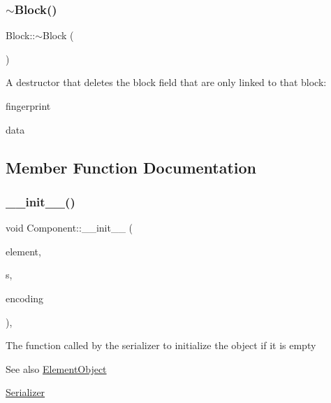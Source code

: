 \subsubsection{\texorpdfstring{$\sim$\+Block()}{~Block()}}
{\footnotesize\ttfamily Block\+::$\sim$\+Block (\begin{DoxyParamCaption}{ }\end{DoxyParamCaption})\hspace{0.3cm}{\ttfamily [override]}}

A destructor that deletes the block field that are only linked to that block\+:
\begin{DoxyItemize}
\item fingerprint
\item data 
\end{DoxyItemize}

\subsection{Member Function Documentation}
\mbox{\label{classComponent_a28212595f8ee85fe009bd233bc99b2fc}} 
\subsubsection{\texorpdfstring{\+\_\+\+\_\+init\+\_\+\+\_\+()}{\_\_init\_\_()}}
{\footnotesize\ttfamily void Component\+::\+\_\+\+\_\+init\+\_\+\+\_\+ (\begin{DoxyParamCaption}\item[{\mbox{\hyperlink{classElementObject}{Element\+Object}} $\ast$}]{element,  }\item[{const \mbox{\hyperlink{classSerializer}{Serializer}} $\ast$}]{s,  }\item[{const char $\ast$}]{encoding }\end{DoxyParamCaption})\hspace{0.3cm}{\ttfamily [inline]}, {\ttfamily [inherited]}}

The function called by the serializer to initialize the object if it is empty \begin{DoxySeeAlso}{See also}
\mbox{\hyperlink{classElementObject}{Element\+Object}} 

\mbox{\hyperlink{classSerializer}{Serializer}}
\end{DoxySeeAlso}

